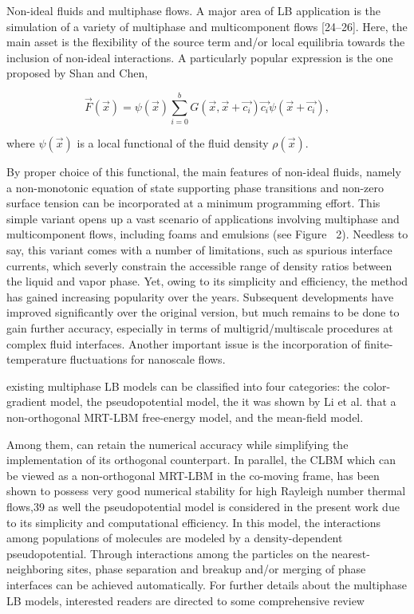 Non-ideal fluids and multiphase flows. 
A major area of LB application is the simulation of a variety of multiphase and multicomponent flows [24–26]. Here, the main asset is the flexibility of the source term and/or local equilibria towards the inclusion of non-ideal interactions. A particularly popular expression is the one proposed by Shan and Chen,

\begin{equation}
	\vec{F}(\vec{x}) = \psi(\vec{x}) \sum_{i=0}^{b}G(\vec{x},\vec{x}+\vec{c_i})\vec{c_i}\psi(\vec{x}+\vec{c_i}),
\end{equation}

where $\psi(\vec{x})$ is a local functional of the fluid density $\rho(\vec{x})$.

By proper choice of this functional, the main features of non-ideal fluids, namely a non-monotonic equation of state supporting phase transitions and non-zero surface tension can be incorporated at a minimum programming effort. This simple variant opens up a vast scenario of applications involving multiphase and multicomponent flows, including foams and emulsions (see Figure~ 2). Needless to say, this variant comes with a number of limitations, such as spurious interface currents, which severly constrain the accessible range of density ratios between the liquid and vapor phase. Yet, owing to its simplicity and efficiency, the method has gained increasing popularity over the years. Subsequent developments have improved significantly over the original version, but much remains to be done to gain further accuracy, especially in terms of multigrid/multiscale procedures at complex fluid interfaces. Another important issue is the incorporation of finite-temperature fluctuations for nanoscale flows.

existing multiphase LB models can be classified into four categories: the color-gradient model, the pseudopotential model, the it was shown by Li et al. that a non-orthogonal MRT-LBM free-energy model, and the mean-field model.
%

Among them, can retain the numerical accuracy while simplifying the implementation of its orthogonal counterpart. In parallel, the CLBM which can be viewed as a non-orthogonal MRT-LBM in the co-moving frame, has been shown to possess very good numerical stability for high Rayleigh number thermal flows,39 as well the pseudopotential model is considered in the present work due to its simplicity and computational efficiency. In this model, the interactions among populations of molecules are modeled by a density-dependent pseudopotential. Through interactions among the particles on the nearest-neighboring sites, phase separation and breakup and/or merging of phase interfaces can be achieved automatically. For further details about the multiphase LB models, interested readers are directed to some comprehensive review

